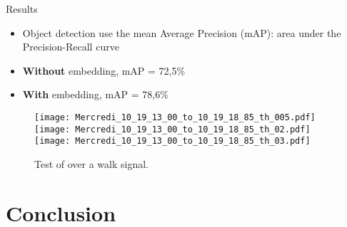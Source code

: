 \begin{frame}{Results}
\begin{itemize}
    \item Object detection use the mean Average Precision (mAP): area under the Precision-Recall curve
    \item \textbf{Without} embedding, mAP = 72,5\%
    \item \textbf{With} embedding, mAP = 78,6\%
\end{itemize}
\pause

\begin{figure}[h]
    \begin{overprint}
        \centering\texttt{[image: Mercredi\_10\_19\_13\_00\_to\_10\_19\_18\_85\_th\_005.pdf]}
        \centering\texttt{[image: Mercredi\_10\_19\_13\_00\_to\_10\_19\_18\_85\_th\_02.pdf]}
        \centering\texttt{[image: Mercredi\_10\_19\_13\_00\_to\_10\_19\_18\_85\_th\_03.pdf]}
    \end{overprint}
    \caption{Test of \subalgo over a walk signal.}
\end{figure}
\end{frame}

\section{Conclusion}
\subsection{}

